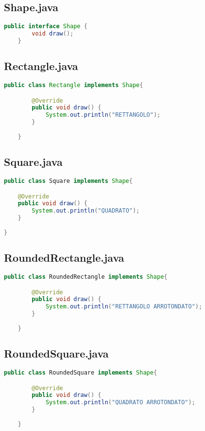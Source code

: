     \subsection{Shape.java}
\begin{lstlisting}[language=java]
    public interface Shape {
        void draw();
    }
\end{lstlisting}

    \subsection{Rectangle.java}
\begin{lstlisting}[language=java]
    public class Rectangle implements Shape{

        @Override
        public void draw() {
            System.out.println("RETTANGOLO");
        }
        
    }
\end{lstlisting}

    \subsection{Square.java}
\begin{lstlisting}[language=java]
    public class Square implements Shape{

    @Override
    public void draw() {
        System.out.println("QUADRATO");
    }
    
}
\end{lstlisting}

    \subsection{RoundedRectangle.java}
\begin{lstlisting}[language=java]
    public class RoundedRectangle implements Shape{

        @Override
        public void draw() {
            System.out.println("RETTANGOLO ARROTONDATO");
        }
        
    }
\end{lstlisting}

    \subsection{RoundedSquare.java}
\begin{lstlisting}[language=java]
    public class RoundedSquare implements Shape{

        @Override
        public void draw() {
            System.out.println("QUADRATO ARROTONDATO");
        }
        
    }
\end{lstlisting}

